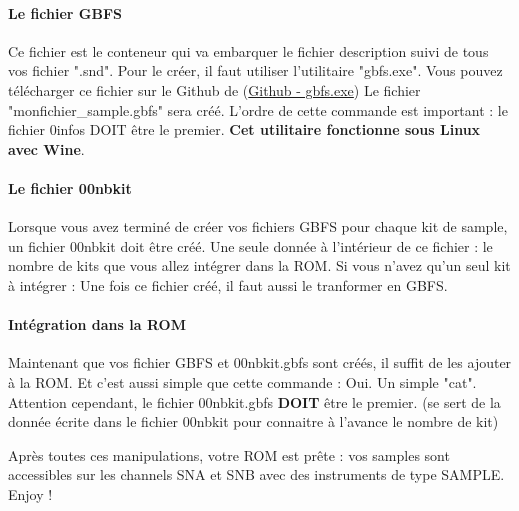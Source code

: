 \paragraph{Le fichier GBFS} Ce fichier est le conteneur qui va embarquer le fichier description suivi de tous vos fichier ".snd".
Pour le créer, il faut utiliser l'utilitaire "gbfs.exe".
Vous pouvez télécharger ce fichier sur le Github de \FAT (\href{https://github.com/cbrouillard/furiousadvancetracker/blob/master/gbfs.exe?raw=true}{Github - gbfs.exe})
Le fichier "monfichier\_sample.gbfs" sera créé.
L'ordre de cette commande est important : le fichier 0infos DOIT être le premier.
{\bf Cet utilitaire fonctionne sous Linux avec Wine}.

\paragraph{Le fichier 00nbkit} Lorsque vous avez terminé de créer vos fichiers GBFS pour chaque kit de sample, un fichier 00nbkit doit être créé.
Une seule donnée à l'intérieur de ce fichier : le nombre de kits que vous allez intégrer dans la ROM.
Si vous n'avez qu'un seul kit à intégrer :
Une fois ce fichier créé, il faut aussi le tranformer en GBFS.

\paragraph{Intégration dans la ROM} Maintenant que vos fichier GBFS et 00nbkit.gbfs sont créés, il suffit de les ajouter à la ROM.
Et c'est aussi simple que cette commande :
Oui. Un simple "cat".
Attention cependant, le fichier 00nbkit.gbfs {\bf DOIT} être le premier.
(\FAT se sert de la donnée écrite dans le fichier 00nbkit pour connaitre à l'avance le nombre de kit)
\medskip

Après toutes ces manipulations, votre ROM est prête : vos samples sont accessibles sur les channels SNA et SNB avec des instruments de type SAMPLE. Enjoy !
